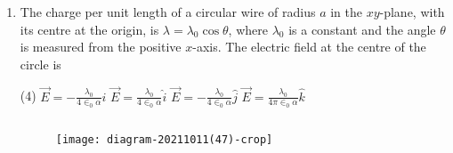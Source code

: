\begin{enumerate}[label=\color{ocre}\textbf{\arabic*.}]
\begin{figure}[H]
\centering
\texttt{[image: diagram-20211011(43)-crop]}
\end{figure}
\begin{tasks}(4)
\task[\textbf{A.}]$\frac{\rho R}{3 \varepsilon_{0}} \hat{n}$
\task[\textbf{B.}] $\frac{\rho R}{3 \varepsilon_{0} a}(\vec{r}-\hat{n} a)$
\task[\textbf{C.}] $\frac{\rho R}{6 \varepsilon_{0}} \hat{n}$
\task[\textbf{D.}] $\frac{\rho a}{3 \varepsilon_{0} R} \vec{r}$ 
\end{tasks}
\begin{answer}$\left. \right. $
\begin{figure}[H]
	\centering
	\texttt{[image: diagram-20211011(44)-crop]}
\end{figure}
\begin{align*}
\text{Electric field at $P$ due to $S_{1}$ is }\vec{E}_{1}&=\frac{\rho}{3 \varepsilon_{0}} \vec{r}_{+}
\intertext{Electric field at $P$ due to $S_{2}$ (assume $\left.-\rho\right)$ is $\vec{E}_{2}=\frac{-\rho}{3 \varepsilon_{0}} \vec{r}_{-}$}
\text{Thus }\vec{E}&=\vec{E}_{1}+\vec{E}_{2}=\frac{\rho}{3 \varepsilon_{0}}\left(\vec{r}_{+}-\vec{r}_{-}\right) ; \\ \because \vec{b}+\vec{r}_{-}&=\vec{r}_{+} \Rightarrow \vec{r}_{+}-\vec{r}=\vec{b}\\
\vec{E}&=\frac{\rho}{3 \varepsilon_{0}} \vec{b}=\frac{\rho R}{6 \varepsilon_{0}} \hat{n}\left(\because \vec{b}=\frac{R}{2} \hat{n}\right)
\end{align*}
So the correct answer is \textbf{Option (C)}
\end{answer}
\item  The charge per unit length of a circular wire of radius $a$ in the $x y$-plane, with its centre at the origin, is $\lambda=\lambda_{0} \cos \theta$, where $\lambda_{0}$ is a constant and the angle $\theta$ is measured from the positive $x$-axis. The electric field at the centre of the circle is
{}

\begin{tasks}(4)
\task[\textbf{A.}] $\vec{E}=-\frac{\lambda_{0}}{4 \in_{0} \alpha} \hat{i}$
\task[\textbf{B.}] $\vec{E}=\frac{\lambda_{0}}{4 \in_{0} \alpha} \hat{i}$
\task[\textbf{C.}] $\vec{E}=-\frac{\lambda_{0}}{4 \in_{0} \alpha} \hat{j}$
\task[\textbf{D.}] $\vec{E}=\frac{\lambda_{0}}{4 \pi \in_{0} \alpha} \hat{k}$
\end{tasks}
\begin{answer}$\left. \right. $\\
\begin{figure}[H]
	\centering
	\texttt{[image: diagram-20211011(47)-crop]}
\end{figure}



\end{answer}
\end{enumerate}
